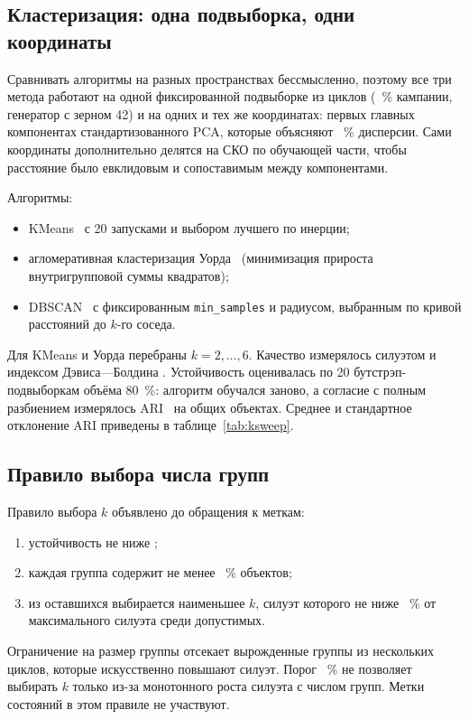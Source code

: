 \documentclass[14pt,a4paper]{extarticle}
\begin{document}
\subsection{Кластеризация: одна подвыборка, одни координаты}

Сравнивать алгоритмы на разных пространствах бессмысленно, поэтому все три
метода работают на одной фиксированной подвыборке из \ClustN{} циклов
(\ClustShareOfAll~\% кампании, генератор с зерном 42) и на одних и тех же
координатах: первых \ClustPcs{} главных компонентах стандартизованного PCA,
которые объясняют \ClustSharePct~\% дисперсии. Сами координаты дополнительно
делятся на СКО по обучающей части, чтобы расстояние было евклидовым и
сопоставимым между компонентами.

Алгоритмы:
\begin{itemize}
\item KMeans~\cite{macqueen} с 20 запусками и выбором лучшего по инерции;
\item агломеративная кластеризация Уорда~\cite{ward} (минимизация прироста
  внутригрупповой суммы квадратов);
\item DBSCAN~\cite{ester} с фиксированным \texttt{min\_samples} и радиусом,
  выбранным по кривой расстояний до $k$-го соседа.
\end{itemize}

Для KMeans и Уорда перебраны $k = 2,\dots,6$. Качество измерялось силуэтом
\cite{rousseeuw} и индексом Дэвиса---Болдина \cite{davies}. Устойчивость
оценивалась по 20 бутстрэп-подвыборкам объёма 80~\%: алгоритм обучался
заново, а согласие с полным разбиением измерялось ARI~\cite{hubert} на общих
объектах. Среднее и стандартное отклонение ARI приведены в
таблице~\ref{tab:ksweep}.

\subsection{Правило выбора числа групп}

Правило выбора $k$ объявлено до обращения к меткам:
\begin{enumerate}
\item устойчивость не ниже \RuleStab;
\item каждая группа содержит не менее \RuleShare~\% объектов;
\item из оставшихся выбирается наименьшее $k$, силуэт которого не ниже
  \RuleSil~\% от максимального силуэта среди допустимых.
\end{enumerate}
Ограничение на размер группы отсекает вырожденные группы из нескольких
циклов, которые искусственно повышают силуэт. Порог \RuleSil~\% не позволяет
выбирать $k$ только из-за монотонного роста силуэта с числом групп. Метки
состояний в этом правиле не участвуют.
\end{document}
